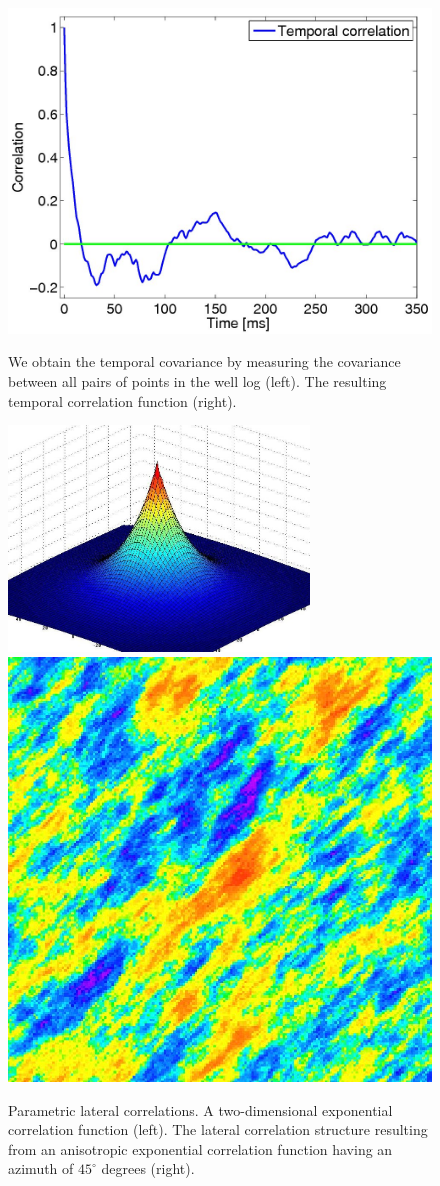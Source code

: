 \begin{figure}
  \includegraphics[width=.7\linewidth              ]{images/implementation/temporal_correlation.jpg}
  \caption{We obtain the temporal covariance by measuring the
    covariance between all pairs of points in the well log (left). The
    resulting temporal correlation function (right).}
  \label{fig:temporal-correlation}
  \vspace{2em}
  \centering
  \includegraphics[width=.52\linewidth,height=6cm]{images/implementation/lateral_correlation_1.jpg}\qquad
  \includegraphics[width=.42\linewidth           ]{images/implementation/lateral_correlation_2.jpg}
  \caption{Parametric lateral correlations. A two-dimensional
    exponential correlation function (left). The lateral correlation
    structure resulting from an anisotropic exponential correlation
    function having an azimuth of $45^\circ$ degrees (right).}
  \label{fig:lateral-correlation}
\end{figure}



